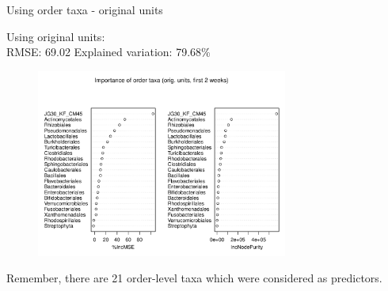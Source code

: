 \documentclass{beamer}
\begin{document}
\begin{frame}{Using order taxa - original units}

  {\scriptsize
    
  \noindent Using original units:\\
  RMSE: 69.02  \hspace{0.05in}  Explained variation: 79.68\%

  \begin{center}
    \begin{figure}
      \includegraphics[width=3.25in]{../only_orders/first_two_weeks/orig_units_first_two_weeks_orders_imp_plot}
    \end{figure}
  \end{center}
  \vspace{-0.25in}

\noindent Remember, there are 21 order-level taxa which were considered as predictors.
}

\end{frame}
\end{document}
